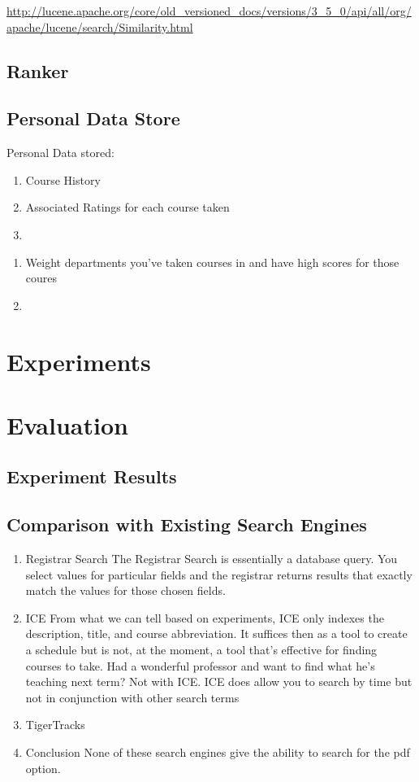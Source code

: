 \documentclass[12pt,letterpaper]{article}
\begin{document}
		\url{http://lucene.apache.org/core/old_versioned_docs/versions/3_5_0/api/all/org/apache/lucene/search/Similarity.html}
		
	\subsection{Ranker}
	\subsection{Personal Data Store}
	Personal Data stored:
		\begin{enumerate}
			\item Course History
			\item Associated Ratings for each course taken
			\item 
		\end{enumerate}
	
		\begin{enumerate}
			\item Weight departments you've taken courses in and have high scores for those coures
			\item 
		\end{enumerate}
\section{Experiments}

\section{Evaluation}
	\subsection{Experiment Results}
	\subsection{Comparison with Existing Search Engines}
		\begin{enumerate}
			\item Registrar Search
				The Registrar Search is essentially a database query. You select values for particular fields and the registrar returns results that exactly match the values for those chosen fields.
			
			\item ICE
				From what we can tell based on experiments, ICE only indexes the description, title, and course abbreviation. It suffices then as a tool to create a schedule but is not, at the moment, a tool that's effective for finding courses to take. Had a wonderful professor and want to find what he's teaching next term? Not with ICE. ICE does allow you to search by time but not in conjunction with other search terms 
			
			\item TigerTracks
			
			\item Conclusion
				None of these search engines give the ability to search for the pdf option. 
		\end{enumerate}
\end{document}
